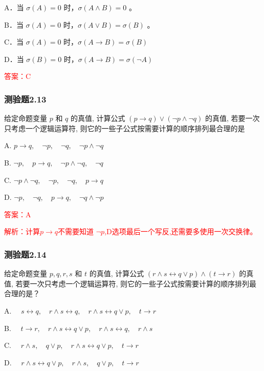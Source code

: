 \documentclass[UTF8, heading=true]{ctexart}
\begin{document}
A．当 $\sigma(A)=0$ 时，$\sigma(A \wedge B)=0$ 。

B．当 $\sigma(A)=0$ 时，$\sigma(A \vee B)=\sigma(B)$ 。

C．当 $\sigma(A)=0$ 时，$\sigma(A \rightarrow B)=\sigma(B)$

D．当 $\sigma(B)=0$ 时，$\sigma(A \rightarrow B)=\sigma(\neg A)$

\textcolor{red}{答案：C}

\subsubsection{测验题2.13}

给定命题变量 $p$ 和 $q$ 的真值, 计算公式 $(p \rightarrow q) \vee(\neg p \wedge \neg q)$ 的真值, 若要一次只考虑一个逻辑运算符, 则它的一些子公式按需要计算的顺序排列最合理的是 $\qquad$

A. $
p \rightarrow q, \quad \neg p, \quad \neg q, \quad \neg p \wedge \neg q
$

B. $
\neg p, \quad p \rightarrow q, \quad \neg p \wedge \neg q, \quad \neg q
$

C. $
\neg p \wedge \neg q, \quad \neg p, \quad \neg q, \quad p \rightarrow q
$

D. $
\neg p, \quad \neg q, \quad p \rightarrow q, \quad \neg q \wedge \neg p
$

\textcolor{red}{答案：A}

\textcolor{red}{解析：计算$p \rightarrow q$不需要知道 $\neg p$,D选项最后一个写反,还需要多使用一次交换律。}


\subsubsection{测验题2.14}

给定命题变量 $p, q, r, s$ 和 $t$ 的真值, 计算公式 $(r \wedge s \leftrightarrow q \vee p) \wedge(t \rightarrow r)$ 的真值, 若要一次只考虑一个逻辑运算符, 则它的一些子公式按需要计算的顺序排列最合理的是？

A. $\quad s \leftrightarrow q, \quad r \wedge s \leftrightarrow q, \quad r \wedge s \leftrightarrow q \vee p, \quad t \rightarrow r$

B. $\quad t \rightarrow r, \quad r \wedge s \leftrightarrow q \vee p, \quad r \wedge s \leftrightarrow q, \quad r \wedge s$

C. $\quad r \wedge s, \quad q \vee p, \quad r \wedge s \leftrightarrow q \vee p, \quad t \rightarrow r$

D. $\quad r \wedge s \leftrightarrow q \vee p, \quad r \wedge s, \quad q \vee p, \quad t \rightarrow r$
\end{document}
